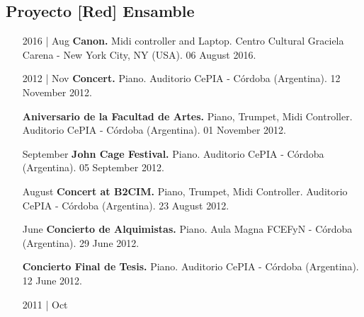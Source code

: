 \documentclass[12pt,overlapped]{res}%
\begin{document}
\begin{resume}
\subsection{Proyecto {[}Red{]} Ensamble}%
\fullline%
\begin{itemize}[align=parleft,leftmargin=2.25cm,labelwidth=2cm]
\item[2016 | Aug]
\textbf{Canon.}
Midi controller and Laptop. 
Centro Cultural Graciela Carena {-} New York City, NY (USA). 
06 August 2016.
\end{itemize}%
\begin{itemize}[align=parleft,leftmargin=2.25cm,labelwidth=2cm]
\item[2012 | Nov]
\textbf{Concert.}
Piano. 
Auditorio CePIA {-} Córdoba (Argentina). 
12 November 2012.
\end{itemize}%
\begin{itemize}[align=parleft,leftmargin=2.25cm,labelwidth=2cm]
\item[]
\textbf{Aniversario de la Facultad de Artes.}
Piano, Trumpet, Midi Controller. 
Auditorio CePIA {-} Córdoba (Argentina). 
01 November 2012.
\end{itemize}%
\begin{itemize}[align=parleft,leftmargin=2.25cm,labelwidth=2cm]
\item[September]
\textbf{John Cage Festival.}
Piano. 
Auditorio CePIA {-} Córdoba (Argentina). 
05 September 2012.
\end{itemize}%
\begin{itemize}[align=parleft,leftmargin=2.25cm,labelwidth=2cm]
\item[August]
\textbf{Concert at B2CIM.}
Piano, Trumpet, Midi Controller. 
Auditorio CePIA {-} Córdoba (Argentina). 
23 August 2012.
\end{itemize}%
\begin{itemize}[align=parleft,leftmargin=2.25cm,labelwidth=2cm]
\item[June]
\textbf{Concierto de Alquimistas.}
Piano. 
Aula Magna FCEFyN {-} Córdoba (Argentina). 
29 June 2012.
\end{itemize}%
\begin{itemize}[align=parleft,leftmargin=2.25cm,labelwidth=2cm]
\item[]
\textbf{Concierto Final de Tesis.}
Piano. 
Auditorio CePIA {-} Córdoba (Argentina). 
12 June 2012.
\end{itemize}%
\begin{itemize}[align=parleft,leftmargin=2.25cm,labelwidth=2cm]
\item[2011 | Oct]

\end{itemize}
\end{resume}
\end{document}
